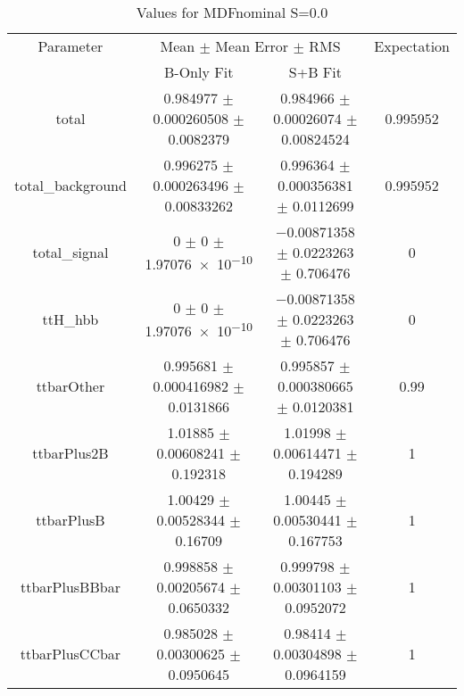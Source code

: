 \begin{table}
\centering
\caption{Values for MDFnominal S=0.0}
\begin{tabular}{cccc}
\toprule
Parameter & \multicolumn{2}{c}{Mean $\pm$ Mean Error $\pm$ RMS} & Expectation\\
 & B-Only Fit & S+B Fit & \\
\midrule
total & \num{0.984977} $\pm$ \num{0.000260508} $\pm$ \num{0.0082379} & \num{0.984966} $\pm$ \num{0.00026074} $\pm$ \num{0.00824524} & \num{0.995952}\\
total\_background & \num{0.996275} $\pm$ \num{0.000263496} $\pm$ \num{0.00833262} & \num{0.996364} $\pm$ \num{0.000356381} $\pm$ \num{0.0112699} & \num{0.995952}\\
total\_signal & \num{0} $\pm$ \num{0} $\pm$ \num{1.97076e-10} & \num{-0.00871358} $\pm$ \num{0.0223263} $\pm$ \num{0.706476} & \num{0}\\
ttH\_hbb & \num{0} $\pm$ \num{0} $\pm$ \num{1.97076e-10} & \num{-0.00871358} $\pm$ \num{0.0223263} $\pm$ \num{0.706476} & \num{0}\\
ttbarOther & \num{0.995681} $\pm$ \num{0.000416982} $\pm$ \num{0.0131866} & \num{0.995857} $\pm$ \num{0.000380665} $\pm$ \num{0.0120381} & \num{0.99}\\
ttbarPlus2B & \num{1.01885} $\pm$ \num{0.00608241} $\pm$ \num{0.192318} & \num{1.01998} $\pm$ \num{0.00614471} $\pm$ \num{0.194289} & \num{1}\\
ttbarPlusB & \num{1.00429} $\pm$ \num{0.00528344} $\pm$ \num{0.16709} & \num{1.00445} $\pm$ \num{0.00530441} $\pm$ \num{0.167753} & \num{1}\\
ttbarPlusBBbar & \num{0.998858} $\pm$ \num{0.00205674} $\pm$ \num{0.0650332} & \num{0.999798} $\pm$ \num{0.00301103} $\pm$ \num{0.0952072} & \num{1}\\
ttbarPlusCCbar & \num{0.985028} $\pm$ \num{0.00300625} $\pm$ \num{0.0950645} & \num{0.98414} $\pm$ \num{0.00304898} $\pm$ \num{0.0964159} & \num{1}\\
\bottomrule
\end{tabular}
\end{table}